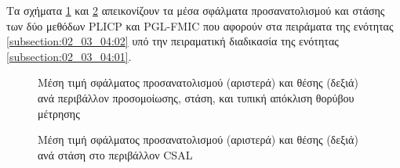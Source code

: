 Τα σχήματα \ref{fig:appendix:03_04:sim_orientation_position_errors}
και \ref{fig:appendix:03_04:csal_orientation_position_errors} απεικονίζουν
τα μέσα σφάλματα προσανατολισμού και στάσης των δύο μεθόδων PLICP και PGL-FMIC
που αφορούν στα πειράματα της ενότητας \ref{subsection:02_03_04:02} υπό
την πειραματική διαδικασία της ενότητας \ref{subsection:02_03_04:01}.

\begin{figure}
  \begin{subfigure}{0.5\linewidth}
    
  \end{subfigure}\hspace{1.0cm}
  \begin{subfigure}{0.5\linewidth}
    
  \end{subfigure}
  \vspace{-2.5cm}
\caption{\small Μέση τιμή σφάλματος προσανατολισμού (αριστερά) και θέσης
         (δεξιά) ανά περιβάλλον προσομοίωσης, στάση, και τυπική απόκλιση θορύβου
         μέτρησης}
\label{fig:appendix:03_04:sim_orientation_position_errors}
\end{figure}

\begin{figure}[]
  \begin{subfigure}{0.5\linewidth}
    
  \end{subfigure}\hspace{1.0cm}
  \begin{subfigure}{0.5\linewidth}
    
  \end{subfigure}
  \vspace{1cm}
\caption{\small Μέση τιμή σφάλματος προσανατολισμού (αριστερά) και θέσης
         (δεξιά) ανά στάση στο περιβάλλον CSAL}
\label{fig:appendix:03_04:csal_orientation_position_errors}
\end{figure}
